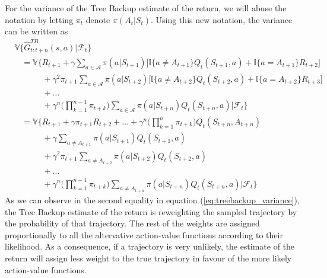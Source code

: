 For the variance of the Tree Backup estimate of the return, we will abuse the notation by letting $\pi_t$ denote $\pi(A_t|S_t)$.
Using this new notation, the variance can be written as
\begin{align}
\label{eq:treebackup_variance}
    & \mathbb{V}\{ \hat{G}^{TB}_{t:t+n} (s,a) | \mathcal{F}_t \} 
        \nonumber \\
    &\hspace{10pt} = 
        \mathbb{V} \Big\{ R_{t+1} 
        + \gamma \sum_{a \in \mathcal{A}} \pi(a|S_{t+1}) \big[ 
            \mathbb{I}\{a \neq A_{t+1} \} Q_t (S_{t+1}, a) + \mathbb{I}\{ a = A_{t+1} \} R_{t+2}
        \big]
        \nonumber \\
    &\hspace{40pt} +
        \gamma^2 \pi_{t+1} \sum_{a \in \mathcal{A}} \pi(a|S_{t+2}) \big[ 
            \mathbb{I}\{a \neq A_{t+2} \} Q_t (S_{t+2}, a) + \mathbb{I}\{ a = A_{t+2} \} R_{t+3}
        \big]
        \nonumber \\
    &\hspace{40pt} +
        ...
        \nonumber \\
    & \hspace{40pt} +
        \gamma^n \Big(\prod^{n-1}_{k=1}\pi_{t+k} \Big)
        \sum_{a \in \mathcal{A}} \pi(a|S_{t+n}) Q_t(S_{t+n}, a)
        \big| \mathcal{F}_t \Big\}
        \nonumber \\
    & \hspace{10pt} =
        \mathbb{V} \Big\{ R_{t+1} + \gamma \pi_{t+1} R_{t+2} + ... + \gamma^n \Big(\prod^{n}_{k=1}\pi_{t+k} \Big) Q_t(S_{t+n}, A_{t+n})
        \nonumber \\
    & \hspace{40pt} +
        \gamma \sum_{a \neq A_{t+1}} \pi(a|S_{t+1}) Q_t(S_{t+1}, a)
        \nonumber \\
    & \hspace{40pt}
        + \gamma^2 \pi_{t+1} \sum_{a \neq A_{t+2}} \pi(a|S_{t+2}) Q_t(S_{t+2}, a)
        \nonumber \\
    & \hspace{40pt} +
        ...
        \nonumber \\
    & \hspace{40pt} +
        \gamma^n \Big(\prod^{n-1}_{k=1}\pi_{t+k} \Big)  \sum_{a \neq A_{t+n}} 
        \pi(a|S_{t+n}) Q_t(S_{t+n}, a) \big| \mathcal{F}_t \Big\}
\end{align}
%
As we can observe in the second equality in equation (\ref{eq:treebackup_variance}), the Tree Backup estimate of the return is reweighting the sampled trajectory by the probability of that trajectory.
The rest of the weights are assigned proportionally to all the altervative action-value functions according to their likelihood.
As a consequence, if a trajectory is very unlikely, the estimate of the return will assign less weight to the true trajectory in favour of the more likely action-value functions. 

